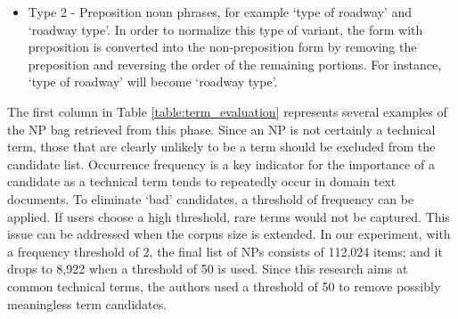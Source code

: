 \documentclass[Journal, BackFigs,NoLists, DoubleSpace]{ascelike}%
\begin{document}
\begin{enumerate} [label=\roman*]
\begin{itemize}
		\item Type 2 - Preposition noun phrases, for example `type of roadway' and `roadway type'. In order to normalize this type of variant, the form with preposition is converted into the non-preposition form by removing the preposition and reversing the order of the remaining portions. For instance, `type of roadway' will become `roadway type'.
\end{itemize}
\end{enumerate}
%
\par
The first column in Table \ref{table:term_evaluation} represents several examples of the NP bag retrieved from this phase. Since an NP is not certainly a technical term, those that are clearly unlikely to be a term should be excluded from the candidate list. Occurrence frequency is a key indicator for the importance of a candidate as a technical term tends to repeatedly occur in domain text documents. To eliminate `bad' candidates, a threshold of frequency can be applied. If users choose a high threshold, rare terms would not be captured. This issue can be addressed when the corpus size is extended. In our experiment, with a frequency threshold of 2, the final list of NPs consists of 112,024 items; and it drops to 8,922 when a threshold of 50 is used. Since this research aims at common technical terms, the authors used a threshold of 50 to remove possibly meaningless term candidates. 
%	
\end{document}
